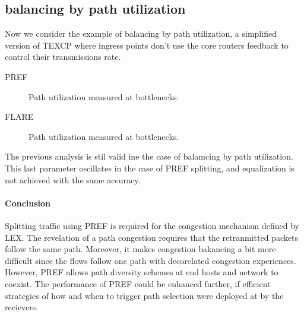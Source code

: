 
\subsection{balancing by path utilization}

Now we consider the example of balancing by path utilization, a simplified version of TEXCP where ingress points don't use the core routers feedback to control their transmissions rate.

PREF

\begin{figure}[h]
 \begin{center}

\caption{
  Path utilization measured at bottlenecks. 
    \label{fig:texcp-util-pref}
}
\end{center}

\end{figure}
FLARE
 \begin{figure}[h!]
 \begin{center}
\caption{
  Path utilization measured at bottlenecks. 
    \label{fig:texcp-util-flare}
}
\end{center}

\end{figure}

The previous analysis is stil valid ine the case of balamcing by path utilization. This last parameter oscillates in the case of PREF splitting, and equalization is not achieved with the same accuracy.

\paragraph{Conclusion}

Splitting traffic using PREF is required for the congestion mechanism defined by LEX. The revelation of a path congestion requires that the retranmitted packets follow the same path. Moreover, it makes congestion bakancing a bit more difficult since the flows follow one path with decorelated congestion experiences. However, PREF allows path diversity schemes at end hosts and network to coexist. The performance of PREF could be enhanced further, if efficient strategies of how and when to trigger path selection were deployed at by the recievers.
 
